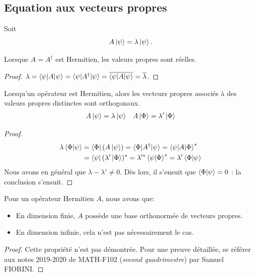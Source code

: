 \documentclass[../notesdecours.tex]{subfiles}
\begin{document}
\subsection{Equation aux vecteurs propres}
Soit 
\begin{equation}
A\ket{\psi} = \lambda\ket{\psi}.
\end{equation}
\begin{Property}
Lorsque $A=A^\dag$ est Hermitien, les valeurs propres sont réelles.
\end{Property}
\begin{proof}
$\lambda = \braket{\psi|A|\psi} = \braket{\psi|A^\dag|\psi} = \overline{\braket{\psi|A|\psi}} = \overline{\lambda}$.
\end{proof}
\begin{Property}
Lorsqu'un opérateur est Hermitien, alors les vecteurs propres associés à des valeurs propres distinctes sont orthogonaux.
\begin{align}
A\ket{\psi} &= \lambda\ket{\psi}		&A\ket{\Phi} = \lambda'\ket{\Phi}
\end{align}
\end{Property}
\begin{proof}
\begin{align*}
\lambda\braket{\Phi|\psi} &= \bra{\Phi}(A\ket{\psi}) = \braket{\Phi|A^\dag|\psi} = \braket{\psi|A|\Phi}^*\\
&= \bra{\psi}(\lambda'\ket{\Phi})^* = \lambda'^* \braket{\psi|\Phi}^* = \lambda' \braket{\Phi|\psi}
\end{align*}
Nous avons en général que $\lambda - \lambda' \neq 0$. Dès lors, il s'ensuit que $\braket{\Phi|\psi} = 0$ : la conclusion s'ensuit.
\end{proof}
\begin{Property}
Pour un opérateur Hermitien $A$, nous avons que:
\begin{itemize}
\item En dimension finie, $A$ possède une base orthonormée de vecteurs propres.
\item En dimension infinie, cela n'est pas nécessairement le cas.
\end{itemize}
\end{Property}
\begin{proof}
Cette propriété n'est pas démontrée. Pour une preuve détaillée, se référer aux notes 2019-2020 de MATH-F102 (\emph{second quadrimestre}) par Samuel FIORINI.
\end{proof}
\end{document}
